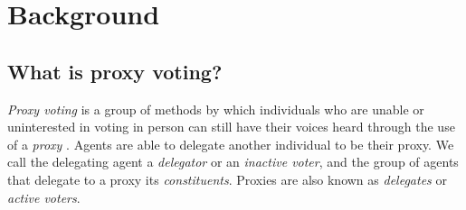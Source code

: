 \section{Background}\label{sec:background}  %

\subsection{What is proxy voting?}\label{subsec:what-is-proxy-voting?}
\textit{Proxy voting} is a group of methods by which individuals who are unable or
uninterested in voting in person can still have their voices heard through the use of
a \textit{proxy} .
Agents are able to delegate another individual to be their proxy.
We call the delegating agent a \textit{delegator} or an \textit{inactive voter}, and
the group of agents that delegate to a proxy its \textit{constituents}.
Proxies are also known as \textit{delegates} or \textit{active voters}.

